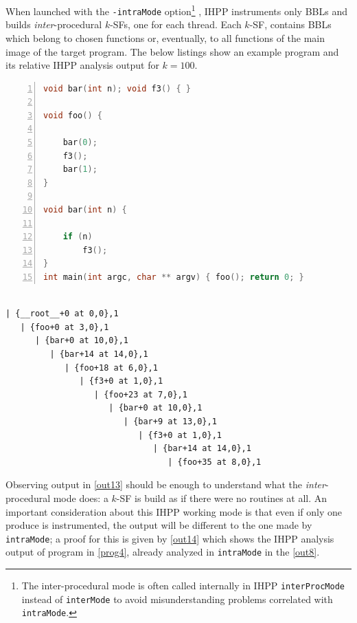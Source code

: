 \documentclass[a4paper,11pt]{report}
\begin{document}
When launched with the \verb|-intraMode| option\footnote{The inter-procedural mode is often called internally in IHPP \texttt{interProcMode} instead of \texttt{interMode} to 
avoid misunderstanding problems correlated with \texttt{intraMode}.}
, IHPP instruments only BBLs 
and builds \emph{inter}-procedural $k$-SFs, one for each thread. 
Each $k$-SF, contains BBLs which belong to chosen functions or, eventually, to all 
functions of the main image of the target program. The below listings show 
an example program and its relative IHPP analysis output for $k=100$.

\begin{lstlisting}[language=C, 
	caption={prog6.c, an example program}, label=prog6, frame=leftline, numbers=left]
void bar(int n); void f3() { }

void foo() { 

	bar(0); 
	f3(); 
	bar(1); 
}

void bar(int n) { 

	if (n) 
		f3(); 
}
int main(int argc, char ** argv) { foo(); return 0; }
\end{lstlisting}

\begin{lstlisting}[label=out13, 
caption={partial output of IHPP analysis in \texttt{interProcMode} of \texttt{prog6}}]

| {__root__+0 at 0,0},1
   | {foo+0 at 3,0},1
      | {bar+0 at 10,0},1
         | {bar+14 at 14,0},1
            | {foo+18 at 6,0},1
               | {f3+0 at 1,0},1
                  | {foo+23 at 7,0},1
                     | {bar+0 at 10,0},1
                        | {bar+9 at 13,0},1
                           | {f3+0 at 1,0},1
                              | {bar+14 at 14,0},1
                                 | {foo+35 at 8,0},1

\end{lstlisting}

Observing output in \cref{out13} should be enough to understand what the 
\emph{inter}-procedural mode does: a $k$-SF is build as if there were no routines at all.
An important consideration about this IHPP working mode is that even if
only one produce is instrumented, the output will be different to the one made by 
\verb|intraMode|; a proof for this is given by \cref{out14} which shows
the IHPP analysis output of program in \cref{prog4}, 
already analyzed in \verb|intraMode| in the \cref{out8}.
\end{document}
